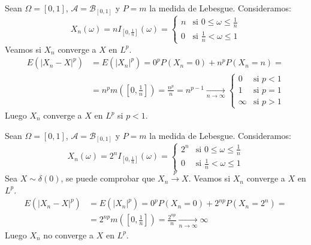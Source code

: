 \begin{example}
    Sean $\Omega = [0, 1]$, $\mathcal{A} = \mathcal{B}_{[0, 1]}$ y $P = m$ la medida de Lebesgue.
    Consideramos:
    $$X_n(\omega) = n I_{[0, \frac{1}{n}]}(\omega) = \begin{cases}
            n & \text{si } 0 \leq \omega \leq \frac{1}{n} \\
            0 & \text{si } \frac{1}{n} < \omega \leq 1
        \end{cases}$$
    Veamos si $X_n$ converge a $X$ en $L^p$.
    \begin{align*}
        E(|X_n - X|^p) & = E(|X_n|^p) = 0^pP(X_n = 0) + n^pP(X_n = n) =                                                                                  \\
                       & = n^pm\left(\left[0, \frac{1}{n}\right]\right) = \frac{n^p}{n} = n^{p-1} \xrightarrow[n \to \infty]{} \begin{cases}
                                                                                                                                   0      & \text{si } p < 1 \\
                                                                                                                                   1      & \text{si } p = 1 \\
                                                                                                                                   \infty & \text{si } p > 1
                                                                                                                               \end{cases}
    \end{align*}
    Luego $X_n$ converge a $X$ en $L^p$ si $p < 1$.
\end{example}

\begin{example}
    Sean $\Omega = [0, 1]$, $\mathcal{A} = \mathcal{B}_{[0, 1]}$ y $P = m$ la medida de Lebesgue.
    Consideramos:
    $$X_n(\omega) = 2^n I_{[0, \frac{1}{n}]}(\omega) = \begin{cases}
            2^n & \text{si } 0 \leq \omega \leq \frac{1}{n} \\
            0   & \text{si } \frac{1}{n} < \omega \leq 1
        \end{cases}$$
    Sea $X \sim \delta(0)$, se puede comprobar que $X_n \xrightarrow{p} X$.
    Veamos si $X_n$ converge a $X$ en $L^p$.
    \begin{align*}
        E(|X_n - X|^p) & = E(|X_n|^p) = 0^pP(X_n = 0) + 2^{np}P(X_n = 2^n) =                                                      \\
                       & = 2^{np}m\left(\left[0, \frac{1}{n}\right]\right) = \frac{2^{np}}{n} \xrightarrow[n \to \infty]{} \infty
    \end{align*}
    Luego $X_n$ no converge a $X$ en $L^p$.
\end{example}

